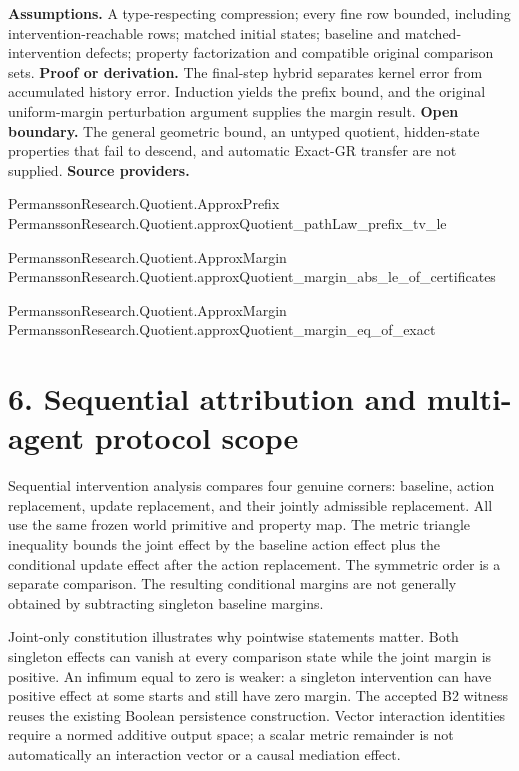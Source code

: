 \documentclass[11pt,a4paper]{article}
\begin{document}
\textbf{Assumptions.} A type-respecting compression; every fine row bounded, including intervention-reachable rows; matched initial states; baseline and matched-intervention defects; property factorization and compatible original comparison sets.
\textbf{Proof or derivation.} The final-step hybrid separates kernel error from accumulated history error. Induction yields the prefix bound, and the original uniform-margin perturbation argument supplies the margin result.
\textbf{Open boundary.} The general geometric bound, an untyped quotient, hidden-state properties that fail to descend, and automatic Exact-GR transfer are not supplied.
\textbf{Source providers.}
{\footnotesize\raggedright PermanssonRe\allowbreak{}search.Quoti\allowbreak{}ent.ApproxPr\allowbreak{}efix\\ PermanssonRe\allowbreak{}search.Quoti\allowbreak{}ent.approxQu\allowbreak{}otient\_pathL\allowbreak{}aw\_prefix\_tv\allowbreak{}\_le\par}
{\footnotesize\raggedright PermanssonRe\allowbreak{}search.Quoti\allowbreak{}ent.ApproxMa\allowbreak{}rgin\\ PermanssonRe\allowbreak{}search.Quoti\allowbreak{}ent.approxQu\allowbreak{}otient\_margi\allowbreak{}n\_abs\_le\_of\_\allowbreak{}certificates\par}
{\footnotesize\raggedright PermanssonRe\allowbreak{}search.Quoti\allowbreak{}ent.ApproxMa\allowbreak{}rgin\\ PermanssonRe\allowbreak{}search.Quoti\allowbreak{}ent.approxQu\allowbreak{}otient\_margi\allowbreak{}n\_eq\_of\_exac\allowbreak{}t\par}
\section{6. Sequential attribution and multi-agent protocol scope}
Sequential intervention analysis compares four genuine corners: baseline, action replacement, update replacement, and their jointly admissible replacement. All use the same frozen world primitive and property map. The metric triangle inequality bounds the joint effect by the baseline action effect plus the conditional update effect after the action replacement. The symmetric order is a separate comparison. The resulting conditional margins are not generally obtained by subtracting singleton baseline margins.

Joint-only constitution illustrates why pointwise statements matter. Both singleton effects can vanish at every comparison state while the joint margin is positive. An infimum equal to zero is weaker: a singleton intervention can have positive effect at some starts and still have zero margin. The accepted B2 witness reuses the existing Boolean persistence construction. Vector interaction identities require a normed additive output space; a scalar metric remainder is not automatically an interaction vector or a causal mediation effect.
\end{document}
